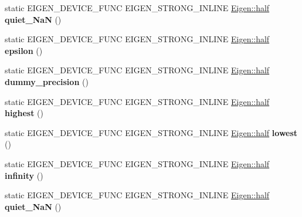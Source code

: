 \begin{DoxyCompactItemize}
static E\+I\+G\+E\+N\+\_\+\+D\+E\+V\+I\+C\+E\+\_\+\+F\+U\+NC E\+I\+G\+E\+N\+\_\+\+S\+T\+R\+O\+N\+G\+\_\+\+I\+N\+L\+I\+NE \hyperlink{struct_eigen_1_1half}{Eigen\+::half} {\bfseries quiet\+\_\+\+NaN} ()
\item 
\mbox{\label{struct_eigen_1_1_num_traits_3_01_eigen_1_1half_01_4_a6fffdc81a58bd3906030d469505ef63d}} 
static E\+I\+G\+E\+N\+\_\+\+D\+E\+V\+I\+C\+E\+\_\+\+F\+U\+NC E\+I\+G\+E\+N\+\_\+\+S\+T\+R\+O\+N\+G\+\_\+\+I\+N\+L\+I\+NE \hyperlink{struct_eigen_1_1half}{Eigen\+::half} {\bfseries epsilon} ()
\item 
\mbox{\label{struct_eigen_1_1_num_traits_3_01_eigen_1_1half_01_4_a09a018ebeae611c150313c8cda0f145a}} 
static E\+I\+G\+E\+N\+\_\+\+D\+E\+V\+I\+C\+E\+\_\+\+F\+U\+NC E\+I\+G\+E\+N\+\_\+\+S\+T\+R\+O\+N\+G\+\_\+\+I\+N\+L\+I\+NE \hyperlink{struct_eigen_1_1half}{Eigen\+::half} {\bfseries dummy\+\_\+precision} ()
\item 
\mbox{\label{struct_eigen_1_1_num_traits_3_01_eigen_1_1half_01_4_a67bf27437a43b8675e40045309539f98}} 
static E\+I\+G\+E\+N\+\_\+\+D\+E\+V\+I\+C\+E\+\_\+\+F\+U\+NC E\+I\+G\+E\+N\+\_\+\+S\+T\+R\+O\+N\+G\+\_\+\+I\+N\+L\+I\+NE \hyperlink{struct_eigen_1_1half}{Eigen\+::half} {\bfseries highest} ()
\item 
\mbox{\label{struct_eigen_1_1_num_traits_3_01_eigen_1_1half_01_4_a7d5f67182bb2516ea3efc7066295513b}} 
static E\+I\+G\+E\+N\+\_\+\+D\+E\+V\+I\+C\+E\+\_\+\+F\+U\+NC E\+I\+G\+E\+N\+\_\+\+S\+T\+R\+O\+N\+G\+\_\+\+I\+N\+L\+I\+NE \hyperlink{struct_eigen_1_1half}{Eigen\+::half} {\bfseries lowest} ()
\item 
\mbox{\label{struct_eigen_1_1_num_traits_3_01_eigen_1_1half_01_4_ac4e7248fc3f54219a3c5b07cedf4d518}} 
static E\+I\+G\+E\+N\+\_\+\+D\+E\+V\+I\+C\+E\+\_\+\+F\+U\+NC E\+I\+G\+E\+N\+\_\+\+S\+T\+R\+O\+N\+G\+\_\+\+I\+N\+L\+I\+NE \hyperlink{struct_eigen_1_1half}{Eigen\+::half} {\bfseries infinity} ()
\item 
\mbox{\label{struct_eigen_1_1_num_traits_3_01_eigen_1_1half_01_4_a0b8075845399063d92caa9e746eaf2e9}} 
static E\+I\+G\+E\+N\+\_\+\+D\+E\+V\+I\+C\+E\+\_\+\+F\+U\+NC E\+I\+G\+E\+N\+\_\+\+S\+T\+R\+O\+N\+G\+\_\+\+I\+N\+L\+I\+NE \hyperlink{struct_eigen_1_1half}{Eigen\+::half} {\bfseries quiet\+\_\+\+NaN} ()
\end{DoxyCompactItemize}



